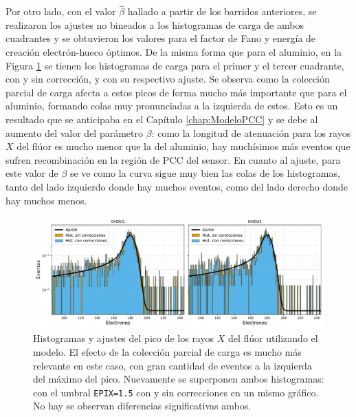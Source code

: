 Por otro lado, con el valor $\hat{\beta}$ hallado a partir de los barridos anteriores, se realizaron los ajustes no bineados a los histogramas de carga de ambos cuadrantes y se obtuvieron los valores para el factor de Fano y energía de creación electrón-hueco óptimos. De la misma forma que para el aluminio, en la Figura \ref{fig:F_OHDU1y3_EPIX15conCorr} se tienen los histogramas de carga para el primer y el tercer cuadrante, con y sin corrección, y con su respectivo ajuste. Se observa como la colección parcial de carga afecta a estos picos de forma mucho más importante que para el aluminio, formando colas muy pronunciadas a la izquierda de estos. Esto es un resultado que se anticipaba en el Capítulo \ref{chap:ModeloPCC} y se debe al aumento del valor del parámetro $\beta$: como la longitud de atenuación para los rayos $X$ del flúor es mucho menor que la del aluminio, hay muchísimos más eventos que sufren recombinación en la región de PCC del sensor. En cuanto al ajuste, para este valor de $\beta$ se ve como la curva sigue muy bien las colas de los histogramas, tanto del lado izquierdo donde hay muchos eventos, como del lado derecho donde hay muchos menos. 
\begin{figure}[h]
    \centering
    \includegraphics[scale=0.5]{Figs/F_hists_ohdu1y3_dobles.pdf}
    \caption{Histogramas y ajustes del pico de los rayos $X$ del flúor utilizando el modelo. El efecto de la colección parcial de carga es mucho más relevante en este caso, con gran cantidad de eventos a la izquierda del máximo del pico. Nuevamente se superponen ambos histogramas: con el umbral \texttt{EPIX=1.5} con y sin correcciones en un mismo gráfico. No hay se observan diferencias significativas ambos.}
    \label{fig:F_OHDU1y3_EPIX15conCorr}
\end{figure}

